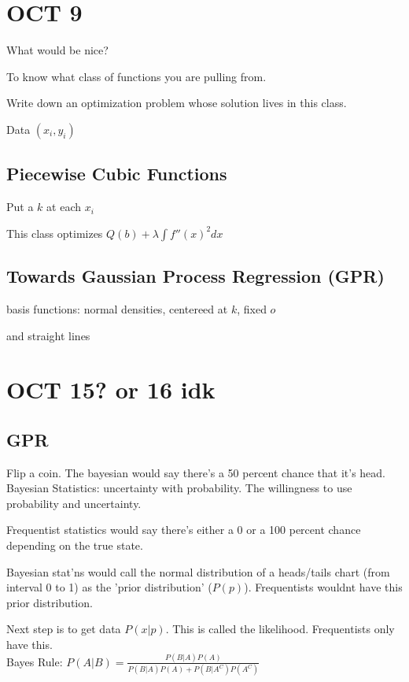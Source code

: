 \documentclass[12pt]{article}
\begin{document}
\section{OCT 9}

What would be nice?

To know what class of functions you are pulling from.

Write down an optimization problem whose solution lives in this class.

Data $(x_i, y_i)$


\subsection{Piecewise Cubic Functions}
Put a $k$ at each $x_i$

This class optimizes $Q(b) + \lambda \int f''(x)^2dx$

\subsection{Towards Gaussian Process Regression (GPR)}

basis functions: normal densities, centereed at $k$, fixed $o$

and straight lines
\\

\section{OCT 15? or 16 idk}

\subsection{GPR}
Flip a coin. The bayesian would say there's a 50 percent chance that it's head. 
Bayesian Statistics: uncertainty with probability. The willingness to use probability and uncertainty. 

Frequentist statistics would say there's either a 0 or a 100 percent chance depending on the true state.

Bayesian stat'ns would call the normal distribution of a heads/tails chart (from interval 0 to 1) as the 'prior distribution' ($P(p)$). Frequentists wouldnt have this prior distribution.

Next step is to get data $P(x|p)$. This is called the likelihood. Frequentists only have this. \\

Bayes Rule: $P(A|B) = \frac{P(B|A)P(A)}{P(B|A)P(A) + P(B|A^C)P(A^C)}$
\end{document}
